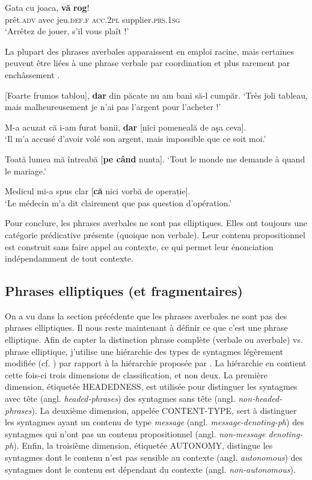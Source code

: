 \ex
\gll  Gata  cu  joaca,  \textbf{vă} \textbf{rog}! \label{ch1:ex39d}\\
    prêt\textsc{.adv}  avec  jeu\textsc{.def.f} \textsc{acc.2pl}  supplier.\textsc{prs.1sg}\\
\glt ‘Arrêtez de jouer, s’il vous plaît !’ 
\z
\z

La plupart des phrases averbales apparaissent en emploi racine, mais certaines peuvent être liées à une phrase verbale par coordination  et plus rarement par enchâssement . 

\ea \label{ch1:ex40}
\ea{}  [Foarte frumos tablou], \textbf{dar} din păcate nu am bani să-l cumpăr. 
\glt ‘Très joli tableau, mais malheureusement je n’ai pas l’argent pour l’acheter !’ 

\ex   M-a acuzat că i-am furat banii, \textbf{dar} [nici pomeneală de aşa ceva]. \\
\glt ‘Il m’a accusé d’avoir volé son argent, mais impossible que ce soit moi.’ 
\z
\z

\ea \label{ch1:ex41}
\ea  Toată lumea mă întreabă [\textbf{pe când} nunta].
\glt ‘Tout le monde me demande à quand le mariage.’ 

\ex Medicul mi-a spus clar [\textbf{că}  nici  vorbă  de  operație].\\
\glt ‘Le médecin m'a dit clairement que pas question d'opération.’
\z
\z

Pour conclure, les phrases averbales ne sont pas elliptiques. Elles ont toujours une catégorie prédicative présente (quoique non verbale). Leur contenu propositionnel est construit sans faire appel au contexte, ce qui permet leur énonciation indépendamment de tout contexte. 


\subsection{Phrases elliptiques (et fragmentaires)} \label{ch1:sect1.3.3}

On a vu dans la section précédente que les phrases averbales ne sont pas des phrases elliptiques. Il nous reste maintenant à définir ce que c’est une phrase elliptique. Afin de capter la distinction phrase complète (verbale ou averbale) vs. phrase elliptique, j’utilise une hiérarchie des types de syntagmes légèrement modifiée (cf. \citealt{Laurens2008}) par rapport à la hiérarchie proposée par \citet{GinzburgEtAl2000}. La hiérarchie en  contient cette fois-ci trois dimensions de classification, et non deux. La première dimension, étiquetée HEADEDNESS, est utilisée pour distinguer les syntagmes avec tête (angl. \textit{headed-phrases}) des syntagmes sans tête (angl. \textit{non-headed-phrases}). La deuxième dimension, appelée CONTENT-TYPE, sert à distinguer les syntagmes ayant un contenu de type \textit{message} (angl. \textit{message-denoting-ph}) des syntagmes qui n’ont pas un contenu propositionnel (angl. \textit{non-message denoting-ph}). Enfin, la troisième dimension, étiquetée AUTONOMY, distingue les syntagmes dont le contenu n’est pas sensible au contexte (angl. \textit{autonomous}) des syntagmes dont le contenu est dépendant du contexte (angl. \textit{non-autonomous}). 


